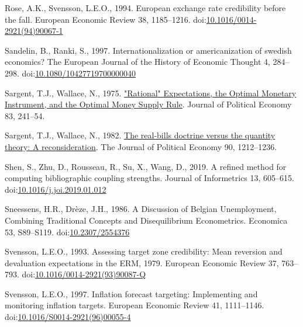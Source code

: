 \documentclass[
  12pt,
  onecolumn]{article}
\newlength{\cslhangindent}
\newlength{\cslentryspacingunit} %
\newenvironment{CSLReferences}[2] %
 {%
  \setlength{\parindent}{0pt}
  \ifodd #1
  \let\oldpar\par
  \def\par{\hangindent=\cslhangindent\oldpar}
  \fi
  \setlength{\parskip}{#2\cslentryspacingunit}
 }%
 {}
\begin{document}
\begin{CSLReferences}{1}{0}
\leavevmode{}%
Rose, A.K., Svensson, L.E.O., 1994. European exchange rate credibility
before the fall. European Economic Review 38, 1185--1216.
doi:\href{https://doi.org/10.1016/0014-2921(94)90067-1}{10.1016/0014-2921(94)90067-1}

\leavevmode{}%
Sandelin, B., Ranki, S., 1997. Internationalization or americanization
of swedish economics? The European Journal of the History of Economic
Thought 4, 284--298.
doi:\href{https://doi.org/10.1080/10427719700000040}{10.1080/10427719700000040}

\leavevmode{}%
Sargent, T.J., Wallace, N., 1975.
\href{http://econpapers.repec.org/article/ucpjpolec/v_3A83_3Ay_3A1975_3Ai_3A2_3Ap_3A241-54.htm}{"{Rational}"
{Expectations}, the {Optimal} {Monetary} {Instrument}, and the {Optimal}
{Money} {Supply} {Rule}}. Journal of Political Economy 83, 241--54.

\leavevmode{}%
Sargent, T.J., Wallace, N., 1982.
\href{http://www.jstor.org/stable/1830945}{The real-bills doctrine
versus the quantity theory: {A} reconsideration}. The Journal of
Political Economy 90, 1212--1236.

\leavevmode{}%
Shen, S., Zhu, D., Rousseau, R., Su, X., Wang, D., 2019. A refined
method for computing bibliographic coupling strengths. Journal of
Informetrics 13, 605--615.
doi:\href{https://doi.org/10.1016/j.joi.2019.01.012}{10.1016/j.joi.2019.01.012}

\leavevmode{}%
Sneessens, H.R., Drèze, J.H., 1986. A {Discussion} of {Belgian
Unemployment}, {Combining Traditional Concepts} and {Disequilibrium
Econometrics}. Economica 53, S89--S119.
doi:\href{https://doi.org/10.2307/2554376}{10.2307/2554376}

\leavevmode{}%
Svensson, L.E.O., 1993. Assessing target zone credibility: {Mean}
reversion and devaluation expectations in the {ERM},
1979. European Economic Review 37, 763--793.
doi:\href{https://doi.org/10.1016/0014-2921(93)90087-Q}{10.1016/0014-2921(93)90087-Q}

\leavevmode{}%
Svensson, L.E.O., 1997. Inflation forecast targeting: {Implementing} and
monitoring inflation targets. European Economic Review 41, 1111--1146.
doi:\href{https://doi.org/10.1016/S0014-2921(96)00055-4}{10.1016/S0014-2921(96)00055-4}


\end{CSLReferences}
\end{document}
